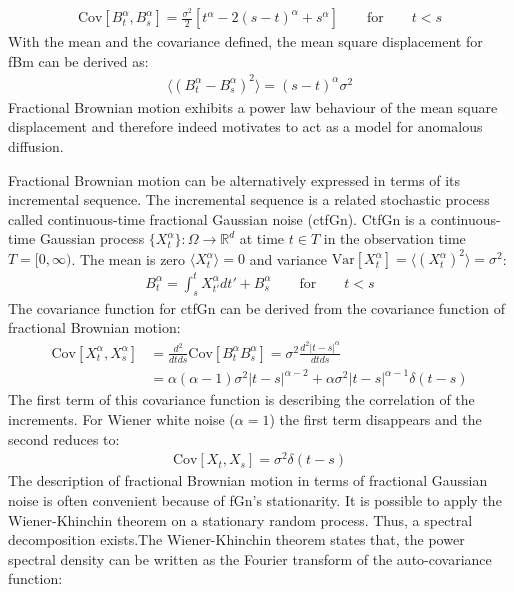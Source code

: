 \documentclass[
  a4paper,BCOR10mm,twoside,
  headsepline,footsepline,%
  fleqn,openbib
]{scrbook}
\begin{document}
\begin{align}
\mathrm{Cov}[B^{\alpha}_t,B^{\alpha}_s]=\frac{\sigma^2}{2}[t^{\alpha}-2(s-t)^{\alpha}+s^{\alpha}] \qquad \text{for} \qquad t<s \label{correlationfunctionfbm}
\end{align}
With the mean and the covariance defined, the mean square displacement for fBm can be derived as: 
\begin{align}
\label{MSDfbm}
 \langle (B^{\alpha}_{t}-B^{\alpha}_{s})^2 \rangle = (s-t)^\alpha \sigma^2
\end{align}
Fractional Brownian motion exhibits a power law behaviour of the mean square displacement and therefore indeed motivates to act as a model for anomalous diffusion.\par Fractional Brownian motion can be alternatively expressed in terms of its incremental sequence. The incremental sequence is a related stochastic process called continuous-time fractional Gaussian noise (ctfGn). CtfGn is a continuous-time Gaussian process $\{X^{\alpha}_t\}: \Omega \rightarrow \mathbb{R}^d$ at time $t \in T$ in the observation time $T =[0, \infty)$. The mean is zero  $\langle X^{\alpha}_t \rangle=0$   and variance $\mathrm{Var}[X^{\alpha}_t]= \langle (X^{\alpha}_t)^2 \rangle=\sigma^2$:
\begin{align}
  B^{\alpha}_t=\int^t_s X^{\alpha}_{t'} d t' +  B^{\alpha}_s \qquad \text{for} \qquad t<s
\end{align}
The covariance function for ctfGn can be derived from the covariance function of fractional Brownian motion:
\begin{align}
\mathrm{Cov}[X^{\alpha}_t,X^{\alpha}_s]&= \frac{d^2}{dt ds} \mathrm{Cov}[B^{\alpha}_t B^{\alpha}_s]=\sigma^2 \frac{d^2 |t-s|^{\alpha}}{dtds} \label{eq:covfgn} \\
 &=\alpha (\alpha-1) \sigma^2 |t-s|^{\alpha-2}+\alpha \sigma^2 |t-s|^{\alpha-1} \delta(t-s) \label{eq:covfgn1}
\end{align}
The first term of this covariance function is describing the correlation of the increments. For Wiener white noise ($\alpha=1$) the first term disappears and the second reduces to:
\begin{align}
 \mathrm{Cov}[X_t,X_s]= \sigma^2 \delta(t-s)
\end{align}
The description of fractional Brownian motion in terms of fractional Gaussian noise is often convenient because of fGn's stationarity. It is possible to apply the Wiener-Khinchin theorem on a stationary random process. Thus, a spectral decomposition exists.The Wiener-Khinchin theorem states that, the power spectral density can be written as the Fourier transform of the auto-covariance function:
\end{document}

